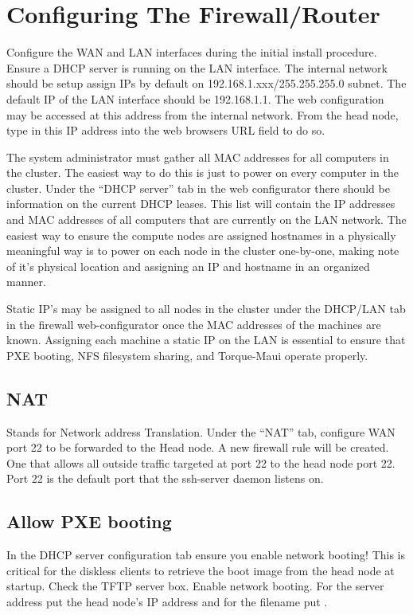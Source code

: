 \documentclass[letterpaper,10pt,english]{sphinxmanual}
\begin{document}
\chapter{Configuring The Firewall/Router}
\label{firewall:configuring-the-firewall-router}\label{firewall::doc}
Configure the WAN and LAN interfaces during the initial install procedure.
Ensure a DHCP server is running on the LAN interface.  The internal network should be
setup assign IPs by default on 192.168.1.xxx/255.255.255.0 subnet.  The default IP of the LAN interface
should be 192.168.1.1.  The web configuration may be accessed at this address from the internal
network.  From the head node, type in this IP address into the web browsers URL field to do so.

The system administrator must gather all MAC addresses for all computers in the
cluster. The easiest way to do this is just to power on every computer in the cluster.  Under the
``DHCP server'' tab in the web configurator there should be information on the current DHCP leases.
This list will contain the IP addresses and MAC addresses of all computers that are currently on
the LAN network.  The easiest way to ensure the compute nodes are assigned hostnames in a physically
meaningful way is to power on each node in the cluster one-by-one, making note of it's physical location
and assigning an IP and hostname in an organized manner.

Static IP's may be assigned to all nodes in the cluster under the DHCP/LAN tab in the firewall
web-configurator once the MAC addresses of the machines are known.  Assigning each machine a static IP on
the LAN is essential to ensure that PXE booting, NFS filesystem sharing, and Torque-Maui operate properly.


\section{NAT}
\label{firewall:nat}
Stands for Network address Translation.  Under the ``NAT'' tab, configure WAN port 22 to be forwarded to the Head node.
A new firewall rule will be created.  One that allows all outside traffic targeted at port 22
to the head node port 22.  Port 22 is the default port that the ssh-server daemon listens on.


\section{Allow PXE booting}
\label{firewall:allow-pxe-booting}
In the DHCP server configuration tab ensure you enable network booting!  This is critical for the diskless clients to retrieve
the boot image from the head node at startup.  Check the TFTP server box.  Enable network booting.
For the server address put the head node's IP address  and for the filename put .
\end{document}
